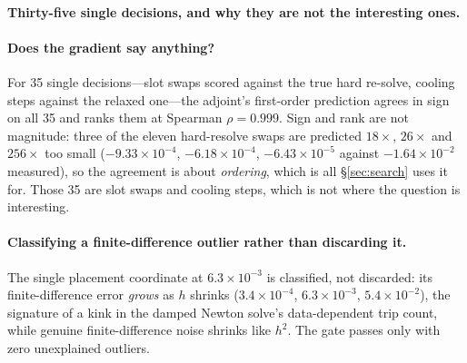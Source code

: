 \documentclass{article}
\begin{document}
\paragraph{Thirty-five single decisions, and why they are not the interesting ones.}
\paragraph{Does the gradient say anything?}
For 35 single decisions---slot swaps scored against the true hard re-solve, cooling steps
against the relaxed one---the adjoint's first-order prediction agrees in sign on all 35
and ranks them at Spearman $\rho = 0.999$.  Sign and rank are not magnitude: three of the
eleven hard-resolve swaps are predicted $18\times$, $26\times$ and $256\times$ too small
($-9.33\times10^{-4}$, $-6.18\times10^{-4}$, $-6.43\times10^{-5}$ against
$-1.64\times10^{-2}$ measured), so the agreement is about \emph{ordering}, which is all
\S\ref{sec:search} uses it for.  Those 35 are slot swaps and cooling steps, which is not where the question is
interesting.

\paragraph{Classifying a finite-difference outlier rather than discarding it.}
The single placement coordinate at
$6.3\times10^{-3}$ is classified, not discarded: its finite-difference error
\emph{grows} as $h$ shrinks ($3.4\times10^{-4}$, $6.3\times10^{-3}$,
$5.4\times10^{-2}$), the signature of a kink in the damped Newton solve's
data-dependent trip count, while genuine finite-difference noise shrinks like
$h^2$.  The gate passes only with zero unexplained outliers.
\end{document}
